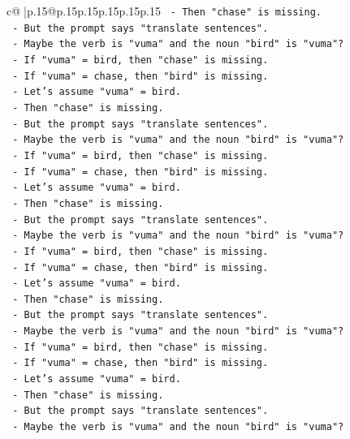 \documentclass{article}
\begin{document}
{\begin{supertabular}{c@{$\;$}|p{.15\linewidth}@{}p{.15\linewidth}p{.15\linewidth}p{.15\linewidth}p{.15\linewidth}p{.15\linewidth}}
{{{\texttt{    {-} Then "chase" is missing.} \\
\texttt{    {-} But the prompt says "translate sentences".} \\
\texttt{    {-} Maybe the verb is "vuma" and the noun "bird" is "vuma"?} \\
\texttt{    {-} If "vuma" = bird, then "chase" is missing.} \\
\texttt{    {-} If "vuma" = chase, then "bird" is missing.} \\
\texttt{    {-} Let's assume "vuma" = bird.} \\
\texttt{    {-} Then "chase" is missing.} \\
\texttt{    {-} But the prompt says "translate sentences".} \\
\texttt{    {-} Maybe the verb is "vuma" and the noun "bird" is "vuma"?} \\
\texttt{    {-} If "vuma" = bird, then "chase" is missing.} \\
\texttt{    {-} If "vuma" = chase, then "bird" is missing.} \\
\texttt{    {-} Let's assume "vuma" = bird.} \\
\texttt{    {-} Then "chase" is missing.} \\
\texttt{    {-} But the prompt says "translate sentences".} \\
\texttt{    {-} Maybe the verb is "vuma" and the noun "bird" is "vuma"?} \\
\texttt{    {-} If "vuma" = bird, then "chase" is missing.} \\
\texttt{    {-} If "vuma" = chase, then "bird" is missing.} \\
\texttt{    {-} Let's assume "vuma" = bird.} \\
\texttt{    {-} Then "chase" is missing.} \\
\texttt{    {-} But the prompt says "translate sentences".} \\
\texttt{    {-} Maybe the verb is "vuma" and the noun "bird" is "vuma"?} \\
\texttt{    {-} If "vuma" = bird, then "chase" is missing.} \\
\texttt{    {-} If "vuma" = chase, then "bird" is missing.} \\
\texttt{    {-} Let's assume "vuma" = bird.} \\
\texttt{    {-} Then "chase" is missing.} \\
\texttt{    {-} But the prompt says "translate sentences".} \\
\texttt{    {-} Maybe the verb is "vuma" and the noun "bird" is "vuma"?} \\
}}}
\end{supertabular}}
\end{document}
